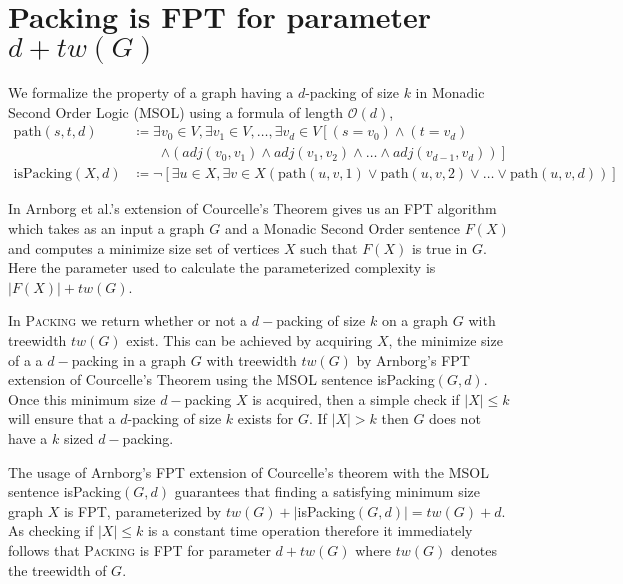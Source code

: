 \documentclass[10pt, a4paper]{article}
\theoremstyle{definition}
\newcommand{\mcO}{\mathcal{O}}
\begin{document}
\section{\sc Packing \textnormal{is FPT for parameter $d + tw(G)$}}

We formalize the property of a graph having a $d$-packing of size $k$ in Monadic Second Order Logic (MSOL) using a formula of length $\mcO(d)$,
\begin{align*}
	\mathrm{path}(s, t, d) 		&\coloneqq \exists v_0 \in V, \exists v_1 \in V, \dotsc, \exists v_d \in V
									\left [ (s=v_0) \wedge (t=v_d) \right.\nonumber \\
								&\qquad \left. \wedge (adj(v_0, v_1) \wedge adj(v_1, v_2) 
									\wedge \dots \wedge adj(v_{d-1}, v_d)) \right ] \\
	\mathrm{isPacking}(X, d)	&\coloneqq \neg \left [\exists u \in X, \exists v \in X (\mathrm{path}(u, v, 1) 
									\vee \mathrm{path}(u, v, 2) \vee \dots \vee \mathrm{path}(u, v, d) ) \right ]
\end{align*}

In Arnborg et al.'s \cite{Arnborg1991} extension of Courcelle's Theorem gives us an FPT algorithm which takes as an input a graph $G$ and a Monadic Second Order sentence $F(X)$ and computes a minimize size set of vertices $X$ such that $F(X)$ is true in $G$. Here the parameter used to calculate the parameterized complexity is $|F(X)| + tw(G)$. 

In \textsc{Packing} we return whether or not a $d-$packing of size $k$ on a graph $G$ with treewidth $tw(G)$ exist. This can be achieved by acquiring $X$, the minimize size of a a $d-$packing in a graph $G$ with treewidth $tw(G)$ by Arnborg's FPT extension of Courcelle's Theorem using the MSOL sentence isPacking$(G,d)$. Once this minimum size $d-$packing $X$ is acquired, then a simple check if $|X| \leq k$ will ensure that a $d$-packing of size $k$ exists for $G$. If $|X| > k$ then $G$ does not have a $k$ sized $d-$packing.



The usage of Arnborg's FPT extension of Courcelle's theorem with the MSOL sentence isPacking$(G,d)$ guarantees that finding a satisfying minimum size graph $X$ is FPT, parameterized by $tw(G) + |$isPacking$(G,d)| = tw(G) + d$. As checking if $|X| \leq k$ is a constant time operation therefore it immediately follows that \textsc{Packing} is FPT for parameter $d+tw(G)$ where $tw(G)$ denotes the treewidth of $G$.




\end{document}
